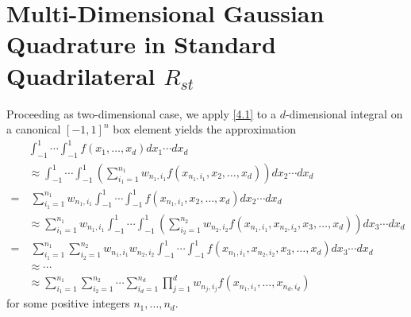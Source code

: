 \documentclass[a4paper]{article}
\numberwithin{equation}{section}
\begin{document}
\section{Multi-Dimensional Gaussian Quadrature in Standard Quadrilateral $R_{st}$}
Proceeding as two-dimensional case, we apply \eqref{4.1} to a $d$-dimensional integral on a canonical ${\left[ { - 1,1} \right]^n}$ box element yields the approximation
\begin{align}
&\int_{ - 1}^1 { \cdots \int_{ - 1}^1 {f\left( {{x_1}, \ldots ,{x_d}} \right)d{x_1} \cdots d{x_d}} } \\
& \approx \int_{ - 1}^1 { \cdots \int_{ - 1}^1 {\left( {\sum\limits_{{i_1} = 1}^{{n_1}} {{w_{{n_1},{i_1}}}f\left( {{x_{{n_1},{i_1}}},{x_2}, \ldots ,{x_d}} \right)} } \right)d{x_2} \cdots d{x_d}} } \\
=&\ \sum\limits_{{i_1} = 1}^{{n_1}} {{w_{{n_1},{i_1}}}\int_{ - 1}^1 { \cdots \int_{ - 1}^1 {f\left( {{x_{{n_1},{i_1}}},{x_2}, \ldots ,{x_d}} \right)d{x_2} \cdots d{x_d}} } } \\
& \approx \sum\limits_{{i_1} = 1}^{{n_1}} {{w_{{n_1},{i_1}}}\int_{ - 1}^1 { \cdots \int_{ - 1}^1 {\left( {\sum\limits_{{i_2} = 1}^{{n_2}} {{w_{{n_2},{i_2}}}f\left( {{x_{{n_1},{i_1}}},{x_{{n_2},{i_2}}},{x_3}, \ldots ,{x_d}} \right)} } \right)d{x_3} \cdots d{x_d}} } } \\
=&\ \sum\limits_{{i_1} = 1}^{{n_1}} {\sum\limits_{{i_2} = 1}^{{n_2}} {{w_{{n_1},{i_1}}}{w_{{n_2},{i_2}}}\int_{ - 1}^1 { \cdots \int_{ - 1}^1 {f\left( {{x_{{n_1},{i_1}}},{x_{{n_2},{i_2}}},{x_3}, \ldots ,{x_d}} \right)d{x_3} \cdots d{x_d}} } } } \\
& \approx  \cdots \\
& \approx \sum\limits_{{i_1} = 1}^{{n_1}} {\sum\limits_{{i_2} = 1}^{{n_2}}  \cdots  \sum\limits_{{i_d} = 1}^{{n_d}} {\prod\limits_{j = 1}^d {{w_{{n_j},{i_j}}}} f\left( {{x_{{n_1},{i_1}}}, \ldots ,{x_{{n_d},{i_d}}}} \right)} } 
\end{align}
for some positive integers $n_1,\ldots,n_d$.
\end{document}
